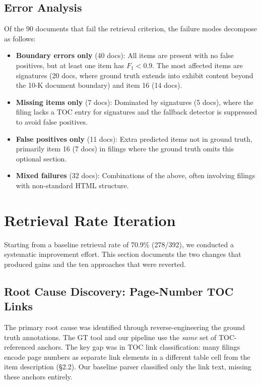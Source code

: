 \documentclass[11pt,a4paper]{article}
\begin{document}
\subsection{Error Analysis}

Of the 90 documents that fail the retrieval criterion, the failure modes decompose as follows:

\begin{itemize}[nosep]
    \item \textbf{Boundary errors only} (40 docs): All items are present with no false positives, but at least one item has $F_1 < 0.9$. The most affected items are signatures (20 docs, where ground truth extends into exhibit content beyond the 10-K document boundary) and item 16 (14 docs).
    \item \textbf{Missing items only} (7 docs): Dominated by signatures (5 docs), where the filing lacks a TOC entry for signatures and the fallback detector is suppressed to avoid false positives.
    \item \textbf{False positives only} (11 docs): Extra predicted items not in ground truth, primarily item 16 (7 docs) in filings where the ground truth omits this optional section.
    \item \textbf{Mixed failures} (32 docs): Combinations of the above, often involving filings with non-standard HTML structure.
\end{itemize}


\section{Retrieval Rate Iteration}\label{sec:iteration}

Starting from a baseline retrieval rate of 70.9\% (278/392), we conducted a systematic improvement effort. This section documents the two changes that produced gains and the ten approaches that were reverted.

\subsection{Root Cause Discovery: Page-Number TOC Links}

The primary root cause was identified through reverse-engineering the ground truth annotations. The GT tool and our pipeline use the \emph{same} set of TOC-referenced anchors. The key gap was in TOC link classification: many filings encode page numbers as separate link elements in a different table cell from the item description (\S2.2). Our baseline parser classified only the link text, missing these anchors entirely.
\end{document}
